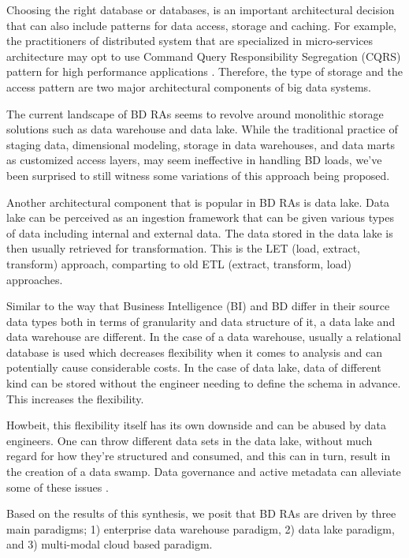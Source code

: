 \documentclass{ieeeaccess}
\begin{document}
Choosing the right database or databases, is an important architectural decision that can also include patterns for data access, storage and caching. For example, the practitioners of distributed system that are specialized in micro-services architecture may opt to use Command Query Responsibility Segregation (CQRS) pattern for high performance applications \cite{marquez2018actual}. Therefore, the type of storage and the access pattern are two major architectural components of big data systems. 

The current landscape of BD RAs seems to revolve around monolithic storage solutions such as data warehouse and data lake. While the traditional practice of staging data, dimensional modeling, storage in data warehouses, and data marts as customized access layers, may seem ineffective in handling BD loads, we've been surprised to still witness some variations of this approach being proposed.  

Another architectural component that is popular in BD RAs is data lake. Data lake can be perceived as an ingestion framework that can be given various types of data including internal and external data. The data stored in the data lake is then usually retrieved for transformation. This is the LET (load, extract, transform) approach, comparting to old ETL (extract, transform, load) approaches. 

Similar to the way that Business Intelligence (BI) and BD differ in their source data types both in terms of granularity and data structure of it, a data lake and data warehouse are different. In the case of a data warehouse, usually a relational database is used which decreases flexibility when it comes to analysis and can potentially cause considerable costs. In the case of data lake, data of different kind can be stored without the engineer needing to define the schema in advance. This increases the flexibility.

Howbeit, this flexibility itself has its own downside and can be abused by data engineers. One can throw different data sets in the data lake, without much regard for how they’re structured and consumed, and this can in turn, result in the creation of a data swamp. Data governance and active metadata can alleviate some of these issues \cite{monolithToMesh}.

Based on the results of this synthesis, we posit that BD RAs are driven by three main paradigms; 1) enterprise data warehouse paradigm, 2) data lake paradigm, and 3) multi-modal cloud based paradigm. 
\end{document}

